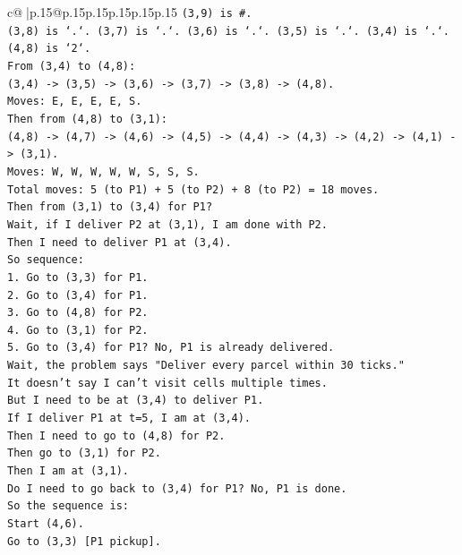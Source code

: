\documentclass{article}
\begin{document}
{\begin{supertabular}{c@{$\;$}|p{.15\linewidth}@{}p{.15\linewidth}p{.15\linewidth}p{.15\linewidth}p{.15\linewidth}p{.15\linewidth}}
{{{\texttt{(3,9) is \#.} \\
\texttt{(3,8) is `.`. (3,7) is `.`. (3,6) is `.`. (3,5) is `.`. (3,4) is `.`.} \\
\texttt{(4,8) is `2`.} \\
\texttt{From (3,4) to (4,8):} \\
\texttt{(3,4) {-}> (3,5) {-}> (3,6) {-}> (3,7) {-}> (3,8) {-}> (4,8).} \\
\texttt{Moves: E, E, E, E, S.} \\
\texttt{Then from (4,8) to (3,1):} \\
\texttt{(4,8) {-}> (4,7) {-}> (4,6) {-}> (4,5) {-}> (4,4) {-}> (4,3) {-}> (4,2) {-}> (4,1) {-}> (3,1).} \\
\texttt{Moves: W, W, W, W, W, S, S, S.} \\
\texttt{Total moves: 5 (to P1) + 5 (to P2) + 8 (to P2) = 18 moves.} \\
\texttt{Then from (3,1) to (3,4) for P1?} \\
\texttt{Wait, if I deliver P2 at (3,1), I am done with P2.} \\
\texttt{Then I need to deliver P1 at (3,4).} \\
\texttt{So sequence:} \\
\texttt{1. Go to (3,3) for P1.} \\
\texttt{2. Go to (3,4) for P1.} \\
\texttt{3. Go to (4,8) for P2.} \\
\texttt{4. Go to (3,1) for P2.} \\
\texttt{5. Go to (3,4) for P1? No, P1 is already delivered.} \\
\texttt{Wait, the problem says "Deliver every parcel within 30 ticks."} \\
\texttt{It doesn't say I can't visit cells multiple times.} \\
\texttt{But I need to be at (3,4) to deliver P1.} \\
\texttt{If I deliver P1 at t=5, I am at (3,4).} \\
\texttt{Then I need to go to (4,8) for P2.} \\
\texttt{Then go to (3,1) for P2.} \\
\texttt{Then I am at (3,1).} \\
\texttt{Do I need to go back to (3,4) for P1? No, P1 is done.} \\
\texttt{So the sequence is:} \\
\texttt{Start (4,6).} \\
\texttt{Go to (3,3) {[}P1 pickup{]}.} \\
}}}
\end{supertabular}}
\end{document}
